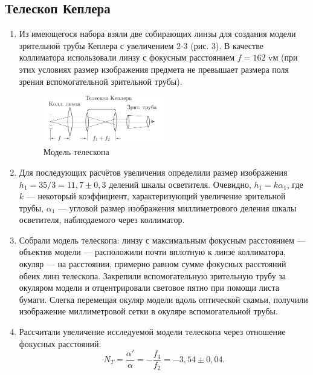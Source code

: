 \documentclass[a4paper, 12pt]{article}%
\begin{document}
	\subsection*{Телескоп Кеплера}
	\begin{enumerate}
		\item Из имеющегося набора взяли две собирающих линзы для создания модели
		зрительной трубы Кеплера с увеличением 2-3 (рис. 3). В качестве коллиматора использовали линзу с фокусным расстоянием $f = 162$ vм (при этих
		условиях размер изображения предмета не превышает размера поля
		зрения вспомогательной зрительной трубы).
											
		\begin{figure}
			\begin{center}
				\includegraphics[width = 0.5\textwidth]{images/412-3.png}
				\caption{Модель телескопа}
			\end{center}
		\end{figure}
		
		\item Для последующих расчётов увеличения определили размер изображения $h_1 = 35/3 = 11,7 \pm 0,3$ делений шкалы осветителя. Очевидно, $h_1 = k\alpha_1$, где $k$ --- некоторый коэффициент, характеризующий увеличение зрительной трубы, $\alpha_1$ --- угловой размер изображения миллиметрового деления шкалы осветителя, наблюдаемого через коллиматор.
		
		\item Собрали модель телескопа: линзу с максимальным фокусным расстоянием --- объектив модели --- расположили почти вплотную к линзе коллиматора, окуляр --- на расстоянии, примерно равном сумме фокусных расстояний обеих линз телескопа.
		Закрепили вспомогательную зрительную трубу за окуляром модели и отцентрировали световое пятно при помощи листа бумаги. Слегка перемещая окуляр модели вдоль оптической скамьи, получили изображение миллиметровой сетки в окуляре вспомогательной трубы.
		
		\item Рассчитали увеличение исследуемой модели телескопа через отношение фокусных расстояний:
		\begin{equation*}
		N_T = \dfrac{\alpha'}{\alpha} = -\dfrac{f_4}{f_2} = -3,54 \pm 0,04.
		\end{equation*}
		

\end{enumerate}
\end{document}
